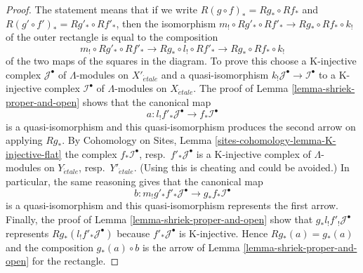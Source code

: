 \documentclass{stacks-project}
\theoremstyle{plain}
\theoremstyle{definition}
\theoremstyle{remark}
\numberwithin{equation}{subsection}
\def\etale{{\acute{e}tale}}
\begin{document}
\begin{proof}
The statement means that if we write
$R(g \circ f)_* = Rg_* \circ Rf_*$ and
$R(g' \circ f')_* = Rg'_* \circ Rf'_*$,
then the isomorphism
$m_! \circ Rg'_* \circ Rf'_* \to Rg_* \circ Rf_* \circ k_!$
of the outer rectangle is equal to the composition
$$
m_! \circ Rg'_* \circ Rf'_* \to
Rg_* \circ l_! \circ Rf'_* \to
Rg_* \circ Rf_* \circ k_!
$$
of the two maps of the squares in the diagram. To prove this choose
a K-injective complex $\mathcal{J}^\bullet$ of $\Lambda$-modules
on $X'_\etale$ and a quasi-isomorphism
$k_!\mathcal{J}^\bullet \to \mathcal{I}^\bullet$
to a K-injective complex $\mathcal{I}^\bullet$ of $\Lambda$-modules
on $X_\etale$. The proof of Lemma \ref{lemma-shriek-proper-and-open}
shows that the canonical map
$$
a : l_!f'_*\mathcal{J}^\bullet \to f_*\mathcal{I}^\bullet
$$
is a quasi-isomorphism and this quasi-isomorphism produces the
second arrow on applying $Rg_*$. By
Cohomology on Sites, Lemma \ref{sites-cohomology-lemma-K-injective-flat}
the complex $f_*\mathcal{I}^\bullet$, resp.\ $f'_*\mathcal{J}^\bullet$
is a K-injective complex of $\Lambda$-modules on 
$Y_\etale$, resp.\ $Y'_\etale$.
(Using this is cheating and could be avoided.)
In particular, the same reasoning gives that the canonical map
$$
b : m_!g'_*f'_*\mathcal{J}^\bullet \to g_*f_*\mathcal{I}^\bullet
$$
is a quasi-isomorphism and this quasi-isomorphism represents
the first arrow. Finally, the proof of Lemma \ref{lemma-shriek-proper-and-open}
show that $g_*l_!f'_!\mathcal{J}^\bullet$ represents
$Rg_*(l_!f'_*\mathcal{J}^\bullet)$ because $f'_*\mathcal{J}^\bullet$
is K-injective. Hence $Rg_*(a) = g_*(a)$ and the composition
$g_*(a) \circ b$ is the arrow of Lemma \ref{lemma-shriek-proper-and-open}
for the rectangle.
\end{proof}
\end{document}
